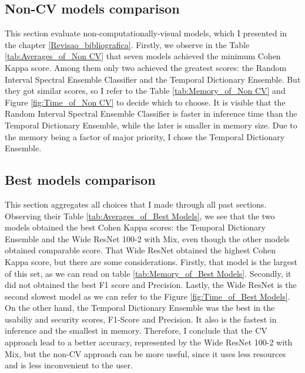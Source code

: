




\FloatBarrier

\subsection{Non-CV models comparison}

This section evaluate non-computationally-visual models, which I presented in the chapter \ref{Revisao_bibliografica}. Firstly, we observe in the Table \ref{tab:Averages_of_Non CV} that seven models achieved the minimum Cohen Kappa score. Among them only two achieved the greatest scores: the Random Interval Spectral Ensemble Classifier and the Temporal Dictionary Ensemble. But they got similar scores, so I refer to the Table \ref{tab:Memory_of_Non CV} and Figure \ref{fig:Time_of_Non CV} to decide which to choose. It is visible that the Random Interval Spectral Ensemble Classifier is faster in inference time than the Temporal Dictionary Ensemble, while the later is smaller in memory size. Due to the memory being a factor of major priority, I chose the Temporal Dictionary Ensemble. 	 






\FloatBarrier

\subsection{Best models comparison}

This section aggregates all choices that I made through all past sections. Observing their Table \ref{tab:Averages_of_Best Models}, we see that the two models obtained the best Cohen Kappa scores: the Temporal Dictionary Ensemble and the Wide ResNet 100-2 with \acrshort{Mix}, even though the other models obtained comparable score. That Wide ResNet obtained the highest Cohen Kappa score, but there are some considerations. Firstly, that model is the largest of this set, as we can read on table \ref{tab:Memory_of_Best Models}. Secondly, it did not obtained the best F1 score and Precision. Lastly, the Wide ResNet is the second slowest model as we can refer to the Figure \ref{fig:Time_of_Best Models}. On the other hand, the Temporal Dictionary Ensemble was the best in the usabiliy and security scores, F1-Score and Precision. It also is the fastest in inference and the smallest in memory. Therefore, I conclude that the \acrshort{CV} approach lead to a better accuracy, represented by the Wide ResNet 100-2 with \acrshort{Mix}, but the non-\acrshort{CV} approach can be more useful, since it uses less resources and is less inconvenient to the user.


